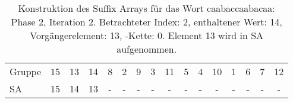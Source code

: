 \begin{table}[H]
\begin{adjustbox}{max width=\textwidth}
\begin{tabular}{lccccccccccccccc}
\multicolumn{1}{l|}{Gruppe}  & \multicolumn{1}{c|}{15} & 13                         & \multicolumn{1}{c|}{14}                         & \multicolumn{1}{c|}{8}     & \multicolumn{1}{c|}{2}      & \multicolumn{1}{c|}{9}    & \multicolumn{1}{c|}{3}     & \multicolumn{1}{c|}{11} & \multicolumn{1}{c|}{5}   & 4  & \multicolumn{1}{c|}{10} & 1   & 6   & 7   & 12  \\
\multicolumn{1}{l|}{SA}      & \multicolumn{1}{c|}{15} & \cellcolor[HTML]{\green}14 & \multicolumn{1}{c|}{\cellcolor[HTML]{\red}13} & \multicolumn{1}{c|}{-}     & \multicolumn{1}{c|}{-}      & \multicolumn{1}{c|}{-}    & \multicolumn{1}{c|}{-}     & \multicolumn{1}{c|}{-}  & \multicolumn{1}{c|}{-}   & -  & \multicolumn{1}{c|}{-}  & -   & -   & -   & -  
\end{tabular}
\end{adjustbox}

\caption[Konstruktion des Suffix Arrays für das Wort caabaccaabacaa: Phase 2, Iteration 2]{Konstruktion des Suffix Arrays für das Wort caabaccaabacaa: Phase 2, Iteration 2. Betrachteter Index: 2, enthaltener Wert: 14, Vorgängerelement: 13, \prevpointer-Kette: 0. Element 13 wird in SA aufgenommen.}
\label{table_complex_example_2_2} 
\end{table}

